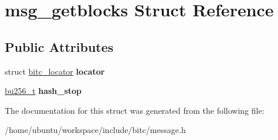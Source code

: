 \hypertarget{structmsg__getblocks}{\section{msg\-\_\-getblocks Struct Reference}
\label{structmsg__getblocks}
}
\subsection*{Public Attributes}
\begin{DoxyCompactItemize}
\item 
\hypertarget{structmsg__getblocks_a3dd2c03e36c5d21c96377a80bc5a39d7}{struct \hyperlink{structbitc__locator}{bitc\-\_\-locator} {\bfseries locator}}\label{structmsg__getblocks_a3dd2c03e36c5d21c96377a80bc5a39d7}

\item 
\hypertarget{structmsg__getblocks_aa4a5e3d8e4c1e307af25b932aa96df2d}{\hyperlink{structbu256}{bu256\-\_\-t} {\bfseries hash\-\_\-stop}}\label{structmsg__getblocks_aa4a5e3d8e4c1e307af25b932aa96df2d}

\end{DoxyCompactItemize}


The documentation for this struct was generated from the following file\-:\begin{DoxyCompactItemize}
\item 
/home/ubuntu/workspace/include/bitc/message.\-h\end{DoxyCompactItemize}

